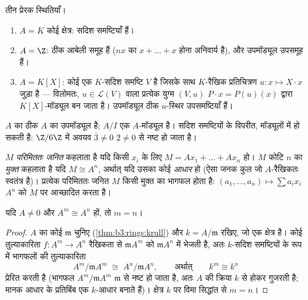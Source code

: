 \begin{example}\label{ex:b3:modules:examples}
तीन प्रेरक स्थितियाँ।
\begin{enumerate}
  \item $A = K$ कोई क्षेत्र:  सदिश समष्टियाँ हैं।
  \item $A = \Z$:  ठीक आबेली समूह हैं ($nx$ का $x + \dots + x$ होना
        अनिवार्य है), और उपमॉड्यूल उपसमूह हैं।
  \item $A = K[X]$: कोई  एक $K$-सदिश समष्टि $V$ है जिसके साथ
        $K$-रैखिक प्रतिचित्रण $u\colon x \mapsto X\cdot x$ जुड़ा है --- विलोमतः, $u \in \mathcal L(V)$
        वाला प्रत्येक युग्म $(V, u)$ $P \cdot x = P(u)(x)$ द्वारा $K[X]$-मॉड्यूल बन
        जाता है। उपमॉड्यूल ठीक $u$-स्थिर उपसमष्टियाँ हैं।
\end{enumerate}
$A$ का  ठीक $A$ का उपमॉड्यूल है;  $A/I$ एक
$A$-मॉड्यूल है। सदिश समष्टियों के विपरीत, मॉड्यूलों में
\emph{} हो सकती है: $\Z/6\Z$ में अवयव $\bar 3 \ne 0$ $2 \neq 0$ से नष्ट हो जाता
है।
\end{example}

\begin{definition}\label{def:b3:modules:free}
$M$ \emph{परिमिततः जनित} कहलाता है
यदि किसी $x_i$ के लिए $M = Ax_1 + \dots + Ax_n$ हो। $M$ कोटि $n$ का
\emph{मुक्त} कहलाता है यदि $M \cong A^n$, अर्थात्
यदि उसका कोई \emph{आधार} हो (ऐसा जनक कुल जो $A$-रैखिकतः स्वतंत्र
है)। प्रत्येक परिमिततः जनित $M$ किसी मुक्त  का भागफल
होता है: $(a_1, \dots, a_n) \mapsto \sum a_ix_i$ $A^n$ को $M$ पर आच्छादित करता है।
\end{definition}

\begin{proposition}[कोटि की अपरिवर्तिता]\label{prop:b3:modules:rank}
यदि $A \neq 0$ और $A^m \cong A^n$ हों, तो $m = n$।
\end{proposition}

\begin{proof}
$A$ का कोई  $\mathfrak m$ चुनिए (\cref{thm:b3:rings:krull}) और $k = A/\mathfrak m$ रखिए, जो एक
क्षेत्र है। कोई तुल्याकारिता $f \colon A^m
\to A^n$ रैखिकता से $\mathfrak m A^m$ को $\mathfrak m A^n$ में
भेजती है, अतः $k$-सदिश समष्टियों के रूप में भागफलों की
तुल्याकारिता
\[
A^m/\mathfrak m A^m \;\cong\; A^n/\mathfrak m A^n,
\qquad\text{अर्थात्}\qquad k^m \cong k^n
\]
प्रेरित करती है (भागफल $A^m/\mathfrak m A^m$ $\mathfrak m$ से नष्ट हो जाता है, अतः $A$
की क्रिया $k$ से होकर गुजरती है; मानक आधार के प्रतिबिंब एक
$k$-आधार बनाते हैं)। क्षेत्र $k$ पर विमा सिद्धांत से $m = n$।
\end{proof}

